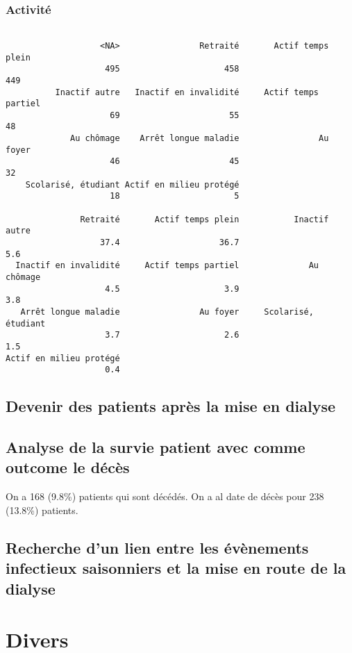 \documentclass[11pt,a4paper]{article}\usepackage[]{graphicx}\usepackage[]{color}
\makeatletter
\newenvironment{kframe}{%
 \def\at@end@of@kframe{}%
 \ifinner\ifhmode%
  \def\at@end@of@kframe{\end{minipage}}%
  \begin{minipage}{\columnwidth}%
 \fi\fi%
 \def\FrameCommand##1{\hskip\@totalleftmargin \hskip-\fboxsep
 \colorbox{shadecolor}{##1}\hskip-\fboxsep
     \hskip-\linewidth \hskip-\@totalleftmargin \hskip\columnwidth}%
 \MakeFramed {\advance\hsize-\width
   \@totalleftmargin\z@ \linewidth\hsize
   \@setminipage}}%
 {\par\unskip\endMakeFramed%
 \at@end@of@kframe}
\newenvironment{knitrout}{}{} %
\makeatother
\begin{document}
    \subsubsection{Activité}

\begin{knitrout}
\color{fgcolor}\begin{kframe}
\begin{verbatim}

                   <NA>                Retraité       Actif temps plein 
                    495                     458                     449 
          Inactif autre   Inactif en invalidité     Actif temps partiel 
                     69                      55                      48 
             Au chômage    Arrêt longue maladie                Au foyer 
                     46                      45                      32 
    Scolarisé, étudiant Actif en milieu protégé 
                     18                       5 

               Retraité       Actif temps plein           Inactif autre 
                   37.4                    36.7                     5.6 
  Inactif en invalidité     Actif temps partiel              Au chômage 
                    4.5                     3.9                     3.8 
   Arrêt longue maladie                Au foyer     Scolarisé, étudiant 
                    3.7                     2.6                     1.5 
Actif en milieu protégé 
                    0.4 
\end{verbatim}
\end{kframe}
\end{knitrout}

  \subsection{Devenir des patients après la mise en dialyse}
  
  \subsection{Analyse de la survie patient avec comme outcome le décès}
  
  On a 168 (9.8\%) patients qui sont décédés. On a al date de décès pour 238 (13.8\%) patients.
  
  \subsection{Recherche d’un lien entre les évènements infectieux saisonniers et la mise en route de la dialyse}
  
\section{Divers}
\end{document}
